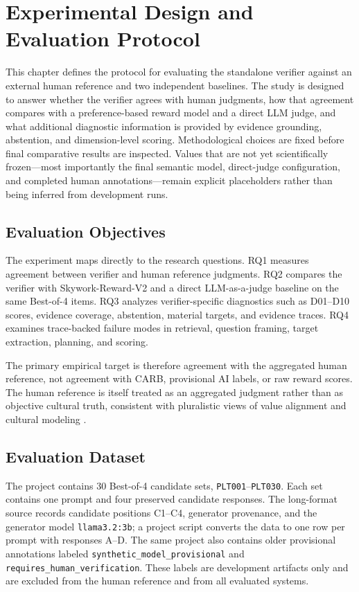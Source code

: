 \chapter{Experimental Design and Evaluation Protocol}
\label{ch:experiment}

This chapter defines the protocol for evaluating the standalone verifier against an external human reference and two independent baselines. The study is designed to answer whether the verifier agrees with human judgments, how that agreement compares with a preference-based reward model and a direct LLM judge, and what additional diagnostic information is provided by evidence grounding, abstention, and dimension-level scoring. Methodological choices are fixed before final comparative results are inspected. Values that are not yet scientifically frozen---most importantly the final semantic model, direct-judge configuration, and completed human annotations---remain explicit placeholders rather than being inferred from development runs.

\section{Evaluation Objectives}

The experiment maps directly to the research questions. RQ1 measures agreement between verifier and human reference judgments. RQ2 compares the verifier with Skywork-Reward-V2 and a direct LLM-as-a-judge baseline on the same Best-of-4 items. RQ3 analyzes verifier-specific diagnostics such as D01--D10 scores, evidence coverage, abstention, material targets, and evidence traces. RQ4 examines trace-backed failure modes in retrieval, question framing, target extraction, planning, and scoring.

The primary empirical target is therefore agreement with the aggregated human reference, not agreement with CARB, provisional AI labels, or raw reward scores. The human reference is itself treated as an aggregated judgment rather than as objective cultural truth, consistent with pluralistic views of value alignment and cultural modeling \parencite{sorensen2024pluralistic,adilazuarda2024culture}.

\section{Evaluation Dataset}
\label{sec:eval-dataset}

The project contains 30 Best-of-4 candidate sets, \texttt{PLT001}--\texttt{PLT030}. Each set contains one prompt and four preserved candidate responses. The long-format source records candidate positions C1--C4, generator provenance, and the generator model \texttt{llama3.2:3b}; a project script converts the data to one row per prompt with responses A--D. The same project also contains older provisional annotations labeled \texttt{synthetic\_model\_provisional} and \texttt{requires\_human\_verification}. These labels are development artifacts only and are excluded from the human reference and from all evaluated systems.

